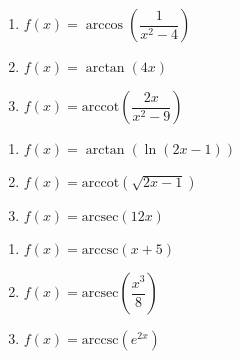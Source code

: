 \documentclass{ximera}
\begin{document}
\begin{multicols}{3}

\begin{enumerate}

\setcounter{enumi}{\value{HW}}

\item  $f(x) = \arccos\left(\dfrac{1}{x^2-4}\right)$
\item  $f(x) = \arctan(4x)$ 
\item  $f(x) = \text{arccot}\left(\dfrac{2x}{x^2-9}\right)$

\setcounter{HW}{\value{enumi}}

\end{enumerate}

\end{multicols}

\begin{multicols}{3}

\begin{enumerate}

\setcounter{enumi}{\value{HW}}

\item  $f(x) =\arctan(\ln(2x-1))$
\item  $f(x) = \text{arccot}(\sqrt{2x-1})$
\item  $f(x) = \text{arcsec}(12x)$

\setcounter{HW}{\value{enumi}}

\end{enumerate}

\end{multicols}

\begin{multicols}{3}

\begin{enumerate}

\setcounter{enumi}{\value{HW}}

\item  $f(x) = \text{arccsc}(x+5)$ 
\item  $f(x) = \text{arcsec}\left(\dfrac{x^3}{8}\right)$
\item  $f(x) = \text{arccsc}\left(e^{2x}\right)$  \label{domainexerlast}

\setcounter{HW}{\value{enumi}}

\end{enumerate}

\end{multicols}
\end{document}
